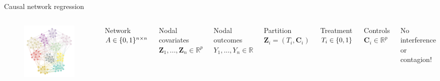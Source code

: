 \documentclass{beamer}
\theoremstyle{remark}
\newcommand{\C}{\bm C}
\newcommand{\Z}{\bm Z}
\newcommand \R {\mathbb{R}}
\DeclarePairedDelimiter{\set}{\{}{\}}
\begin{document}
\begin{frame}{Causal network regression}
    \begin{columns}

        \begin{figure}
            \includegraphics[width=\textwidth]{figures/assortative.png}
        \end{figure}


        Network $A \in \set{0, 1}^{n \times n}$

        Nodal covariates $\Z_1, ..., \Z_n \in \R^{p}$

        Nodal outcomes $Y_1, ..., Y_n \in \R$

        \vspace{6mm}

        Partition $\Z_i = (T_i, \C_i)$

        Treatment $T_i \in \set{0, 1}$

        Controls $\C_i \in \R^p$

        \vspace{6mm}

        No interference or contagion!
    \end{columns}
\end{frame}
\end{document}

